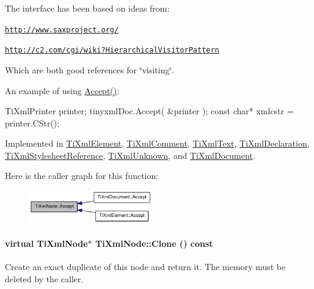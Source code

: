 The interface has been based on ideas from:


\begin{DoxyItemize}
\item \href{http://www.saxproject.org/}{\tt http://www.saxproject.org/}
\item \href{http://c2.com/cgi/wiki?HierarchicalVisitorPattern}{\tt http://c2.com/cgi/wiki?HierarchicalVisitorPattern}
\end{DoxyItemize}

Which are both good references for \char`\"{}visiting\char`\"{}.

An example of using \hyperlink{class_ti_xml_node_acc0f88b7462c6cb73809d410a4f5bb86}{Accept()}: \begin{DoxyVerb}
		TiXmlPrinter printer;
		tinyxmlDoc.Accept( &printer );
		const char* xmlcstr = printer.CStr();
		\end{DoxyVerb}
 

Implemented in \hyperlink{class_ti_xml_element_a31ab28cc3b892a69254391d6bbe08df3}{TiXmlElement}, \hyperlink{class_ti_xml_comment_a4382de0e50da973f11a23ea5852568bd}{TiXmlComment}, \hyperlink{class_ti_xml_text_a43b9954ebf679557fac1a4453f337b7c}{TiXmlText}, \hyperlink{class_ti_xml_declaration_ab6a6b178161ba9abc2c35058de689864}{TiXmlDeclaration}, \hyperlink{class_ti_xml_stylesheet_reference_a540b55b318f90fce1254aa3ecba0331a}{TiXmlStylesheetReference}, \hyperlink{class_ti_xml_unknown_a4e54d7482e05a837cf83c925cc683380}{TiXmlUnknown}, and \hyperlink{class_ti_xml_document_a3daab2f472418ef66315750202f762ae}{TiXmlDocument}.

Here is the caller graph for this function:\nopagebreak
\begin{figure}[H]
\begin{center}
\leavevmode
\includegraphics[width=151pt]{class_ti_xml_node_acc0f88b7462c6cb73809d410a4f5bb86_icgraph}
\end{center}
\end{figure}
\hypertarget{class_ti_xml_node_a4508cc3a2d7a98e96a54cc09c37a78a4}{
\paragraph[{Clone}]{\setlength{\rightskip}{0pt plus 5cm}virtual {\bf TiXmlNode}$\ast$ TiXmlNode::Clone () const}\hfill}
\label{class_ti_xml_node_a4508cc3a2d7a98e96a54cc09c37a78a4}
Create an exact duplicate of this node and return it. The memory must be deleted by the caller. 

